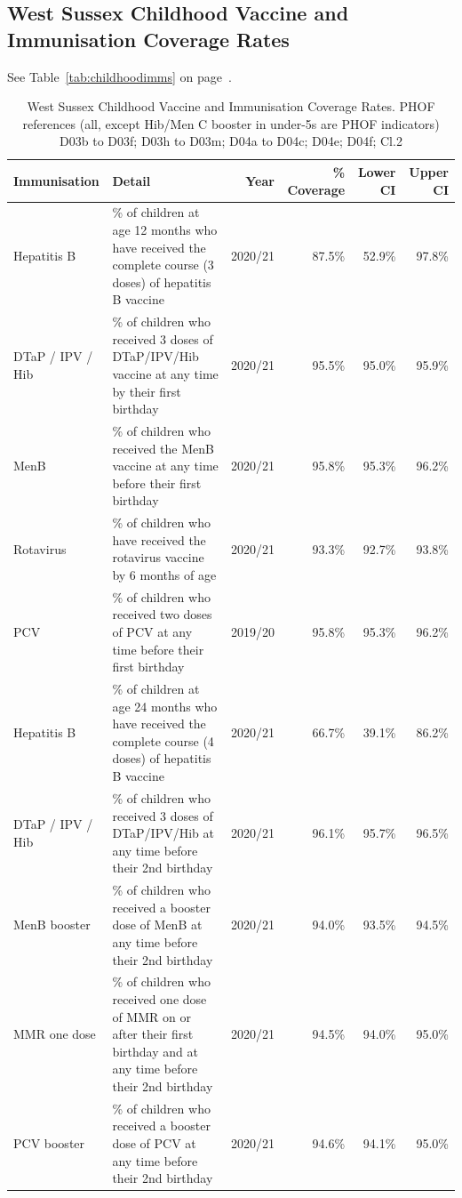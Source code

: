 \subsection{West Sussex Childhood Vaccine and Immunisation Coverage Rates}
See Table~\ref{tab:childhoodimms} on page~\pageref{tab:childhoodimms}.
\begin{table}[hbt]
    \scriptsize
    \caption{West Sussex Childhood Vaccine and Immunisation Coverage Rates. PHOF references (all, except Hib/Men C booster in under-5s are PHOF indicators) D03b to D03f; D03h to D03m; D04a to D04c; D04e; D04f; Cl.2}
    \centering
    \begin{tabular}{llrrrr}
    \toprule
    Immunisation &  Detail & Year & \% Coverage & Lower CI & Upper CI \\
    \midrule
    Hepatitis B & \% of children at age 12 months who have received the complete course (3 doses) of hepatitis B vaccine & 2020/21	& 87.5\% & 52.9\% & 97.8\% \\
    DTaP / IPV / Hib & \% of children who received 3 doses of DTaP/IPV/Hib vaccine at any time by their first birthday & 2020/21 & 95.5\% & 95.0\% & 95.9\% \\
    MenB & \% of children who received the MenB vaccine at any time before their first birthday & 2020/21 & 95.8\% & 95.3\% & 96.2\% \\
    Rotavirus & \% of children who have received the rotavirus vaccine by 6 months of age & 2020/21	& 93.3\% & 92.7\% & 93.8\% \\
    PCV & \% of children who received two doses of PCV at any time before their first birthday & 2019/20 & 95.8\% & 95.3\% & 96.2\% \\
    Hepatitis B & \% of children at age 24 months who have received the complete course (4 doses) of hepatitis B vaccine & 2020/21 & 66.7\% & 39.1\% & 86.2\% \\
    DTaP / IPV / Hib & \% of children who received 3 doses of DTaP/IPV/Hib at any time before their 2nd birthday & 2020/21 & 96.1\% & 95.7\% & 96.5\% \\
    MenB booster & \% of children who received a booster dose of MenB at any time before their 2nd birthday & 2020/21 & 94.0\% & 93.5\% & 94.5\% \\
    MMR one dose & \% of children who received one dose of MMR on or after their first birthday and at any time before their 2nd birthday & 2020/21 & 94.5\% & 94.0\% & 95.0\% \\
    PCV booster & \% of children who received a booster dose of PCV at any time before their 2nd birthday & 2020/21 & 94.6\% & 94.1\% & 95.0\% \\

\end{tabular}
\end{table}
